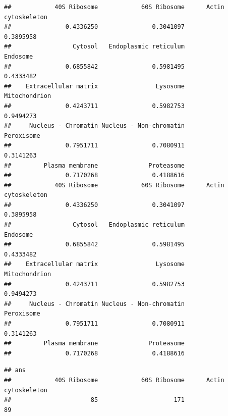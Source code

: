 \begin{knitrout}
\color{fgcolor}\begin{kframe}
\begin{alltt}
 \hlkwb{<-}   \hlstd{=} \hlstd{,}  \hlstd{=} \hlstd{,}  \hlstd{=} \hlstd{,}  \hlstd{=} \hlstd{))}
\end{alltt}
\begin{verbatim}
##            40S Ribosome            60S Ribosome      Actin cytoskeleton 
##               0.4336250               0.3041097               0.3895958 
##                 Cytosol   Endoplasmic reticulum                Endosome 
##               0.6855842               0.5981495               0.4333482 
##    Extracellular matrix                Lysosome           Mitochondrion 
##               0.4243711               0.5982753               0.9494273 
##     Nucleus - Chromatin Nucleus - Non-chromatin              Peroxisome 
##               0.7951711               0.7080911               0.3141263 
##         Plasma membrane              Proteasome 
##               0.7170268               0.4188616
##            40S Ribosome            60S Ribosome      Actin cytoskeleton 
##               0.4336250               0.3041097               0.3895958 
##                 Cytosol   Endoplasmic reticulum                Endosome 
##               0.6855842               0.5981495               0.4333482 
##    Extracellular matrix                Lysosome           Mitochondrion 
##               0.4243711               0.5982753               0.9494273 
##     Nucleus - Chromatin Nucleus - Non-chromatin              Peroxisome 
##               0.7951711               0.7080911               0.3141263 
##         Plasma membrane              Proteasome 
##               0.7170268               0.4188616
\end{verbatim}
\begin{alltt}
 \hlkwb{<-}   \hlstd{=} \hlstd{,}  \hlstd{=} \hlstd{,}  \hlstd{=} \hlstd{,}  
\end{alltt}
\begin{verbatim}
## ans
##            40S Ribosome            60S Ribosome      Actin cytoskeleton 
##                      85                     171                      89 

\end{verbatim}
\end{kframe}
\end{knitrout}
